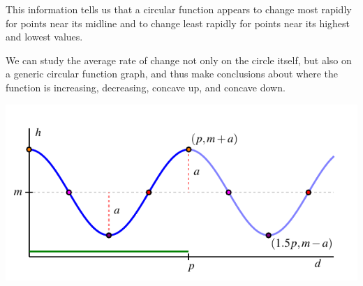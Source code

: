 \documentclass[nooutcomes, noauthor]{ximera}
\begin{document}
This information tells us that a circular function appears to change most rapidly for points near its midline and to change least rapidly for points near its highest and lowest values.%

We can study the average rate of change not only on the circle itself, but also on a generic circular function graph, and thus make conclusions about where the function is increasing, decreasing, concave up, and concave down.%

\begin{image}
\includegraphics{traversing-circular-properties-graph.pdf}
\end{image}
\end{document}
